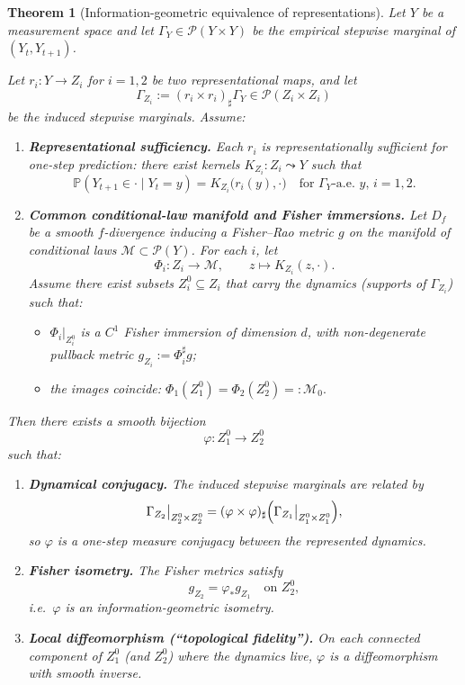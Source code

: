 \documentclass[11pt]{article}
\newtheorem{theorem}{Theorem}
\newcommand{\1}{\mathbf{1}}
\begin{document}
\begin{theorem}[Information-geometric equivalence of representations]
\label{thm:ig-equivalence-reps}
Let $Y$ be a measurement space and let
$\Gamma_Y \in \mathcal{P}(Y \times Y)$
be the empirical stepwise marginal of $(Y_t,Y_{t+1})$.

Let $r_i : Y \to Z_i$ for $i=1,2$ be two representational maps, and let
\[
  \Gamma_{Z_i} := (r_i \times r_i)_{\sharp} \Gamma_Y
  \in \mathcal{P}(Z_i \times Z_i)
\]
be the induced stepwise marginals. Assume:

\begin{enumerate}[label=(A\arabic*),leftmargin=1.8em]
  \item \textbf{Representational sufficiency.}
  Each $r_i$ is representationally sufficient for one-step prediction: there exist
  kernels $K_{Z_i} : Z_i \leadsto Y$ such that
  \[
    \mathbb{P}(Y_{t+1} \in \cdot \mid Y_t=y)
    =
    K_{Z_i}\bigl(r_i(y),\cdot\bigr)
    \quad\text{for $\Gamma_Y$-a.e.\ $y$, $i=1,2$.}
  \]

  \item \textbf{Common conditional-law manifold and Fisher immersions.}
  Let $D_f$ be a smooth $f$-divergence inducing a Fisher--Rao metric $g$ on the
  manifold of conditional laws $\mathcal{M} \subset \mathcal{P}(Y)$.
  For each $i$, let
  \[
    \Phi_i : Z_i \to \mathcal{M},
    \qquad
    z \mapsto K_{Z_i}(z,\cdot).
  \]
  Assume there exist subsets $Z_i^0 \subseteq Z_i$ that carry the dynamics
  (supports of $\Gamma_{Z_i}$) such that:
  \begin{itemize}
    \item $\Phi_i\big|_{Z_i^0}$ is a $C^1$ Fisher immersion of dimension $d$,
          with non-degenerate pullback metric $g_{Z_i} := \Phi_i^\sharp g$;
    \item the images coincide:
          \(
            \Phi_1(Z_1^0) = \Phi_2(Z_2^0) =: \mathcal{M}_0.
          \)
  \end{itemize}
\end{enumerate}

Then there exists a smooth bijection
\[
  \varphi : Z_1^0 \to Z_2^0
\]
such that:
\begin{enumerate}[label=(C\arabic*),leftmargin=1.8em]
  \item \textbf{Dynamical conjugacy.}
    The induced stepwise marginals are related by
    \[
      \Gamma_{Z_2}\big|_{Z_2^0 \times Z_2^0}
      =
      (\varphi \times \varphi)_{\sharp}
      \Bigl( \Gamma_{Z_1}\big|_{Z_1^0 \times Z_1^0} \Bigr),
    \]
    so $\varphi$ is a one-step measure conjugacy between the represented dynamics.

  \item \textbf{Fisher isometry.}
    The Fisher metrics satisfy
    \[
      g_{Z_2} = \varphi_{\ast} g_{Z_1}
      \quad\text{on } Z_2^0,
    \]
    i.e.\ $\varphi$ is an information-geometric isometry.

  \item \textbf{Local diffeomorphism (``topological fidelity'').}
    On each connected component of $Z_1^0$ (and $Z_2^0$) where the dynamics live,
    $\varphi$ is a diffeomorphism with smooth inverse.
\end{enumerate}
\end{theorem}
\end{document}
